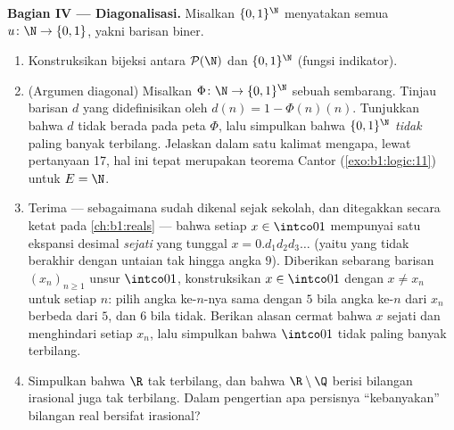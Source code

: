 \begin{problem}
\medskip
\noindent\textbf{Bagian IV --- Diagonalisasi.} Misalkan
$\{0,1\}^{\N}$ menyatakan  semua 
$u \colon \N \to \{0, 1\}$, yakni  barisan biner.
\begin{enumerate}[resume]
  \item Konstruksikan bijeksi antara $\mathcal{P}(\N)$ dan
        $\{0,1\}^{\N}$ (fungsi indikator).
  \item (Argumen diagonal) Misalkan $\Phi \colon \N \to
        \{0,1\}^{\N}$ sebuah  sembarang. Tinjau barisan $d$
        yang didefinisikan oleh $d(n) = 1 - \Phi(n)(n)$. Tunjukkan
        bahwa $d$ tidak berada pada peta $\Phi$, lalu simpulkan bahwa
        $\{0,1\}^{\N}$ \emph{tidak} paling banyak terbilang. Jelaskan
        dalam satu kalimat mengapa, lewat pertanyaan 17, hal ini
        tepat merupakan teorema Cantor
        (\cref{exo:b1:logic:11}) untuk $E = \N$.
  \item Terima --- sebagaimana sudah dikenal sejak sekolah, dan
        ditegakkan secara ketat pada \cref{ch:b1:reals} --- bahwa
        setiap $x \in
        \intco01$ mempunyai satu ekspansi desimal \emph{sejati} yang
        tunggal $x =
        0.d_1 d_2 d_3\dots$ (yaitu yang tidak berakhir dengan untaian
        tak hingga angka $9$). Diberikan sebarang barisan
        $(x_n)_{n \geq 1}$ unsur
        $\intco01$, konstruksikan $x \in \intco01$ dengan
        $x \neq x_n$ untuk setiap $n$: pilih angka ke-$n$-nya sama
        dengan $5$ bila angka ke-$n$
        dari $x_n$ berbeda dari $5$, dan $6$ bila tidak. Berikan
        alasan cermat bahwa $x$ sejati dan menghindari setiap $x_n$,
        lalu simpulkan bahwa $\intco01$ tidak paling banyak terbilang.
  \item Simpulkan bahwa $\R$ tak terbilang, dan bahwa  $\R
        \setminus \Q$ berisi bilangan irasional juga tak terbilang.
        Dalam pengertian apa persisnya ``kebanyakan'' bilangan real
        bersifat irasional?
\end{enumerate}


\end{problem}
